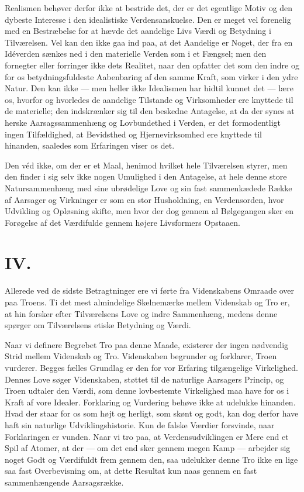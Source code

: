 \documentclass[12pt,a4paper]{article}
\begin{document}
Realismen behøver derfor ikke at bestride det, der er det egentlige
Motiv og den dybeste Interesse i den idealistiske Verdensanskuelse. Den
er meget vel forenelig med en Bestræbelse for at hævde det aandelige
Livs Værdi og Betydning i Tilværelsen. Vel kan den ikke gaa ind paa, at
det Aandelige er Noget, der fra en Idéverden sænkes ned i den materielle
Verden som i et Fængsel; men den fornegter eller forringer ikke dets
Realitet, naar den opfatter det som den indre og for os
betydningsfuldeste Aabenbaring af den samme Kraft, som virker i den
ydre Natur. Den kan ikke --- men heller ikke Idealismen har hidtil
kunnet det --- lære os, hvorfor og hvorledes de aandelige Tilstande og
Virksomheder ere knyttede til de materielle; den indskrænker sig til den
beskedne Antagelse, at da der synes at herske Aarsagssammenhæng og
Lovbundethed i Verden, er det formodentligt ingen Tilfældighed, at
Bevidsthed og Hjernevirksomhed ere knyttede til hinanden, saaledes som
Erfaringen viser os det.

Den véd ikke, om der er et Maal, henimod hvilket hele Tilværelsen
styrer, men den finder i sig selv ikke nogen Umulighed i den Antagelse,
at hele denne store Natursammenhæng med sine ubrødelige Love og sin fast
sammenkædede Række af Aarsager og Virkninger er som en stor Husholdning,
en Verdensorden, hvor Udvikling og Opløsning skifte, men hvor der dog
gennem al Bølgegangen sker en Forøgelse af det Værdifulde gennem højere
Livsformers Opstaaen.

\section*{IV.}

Allerede ved de sidste Betragtninger ere vi førte fra Videnskabens
Omraade over paa Troens. Ti det mest almindelige Skelnemærke mellem
Videnskab og Tro er, at hin forsker efter Tilværelsens Love og indre
Sammenhæng, medens denne spørger om Tilværelsens etiske Betydning og
Værdi.

Naar vi definere Begrebet Tro paa denne Maade, existerer der ingen
nødvendig Strid mellem Videnskab og Tro. Videnskaben begrunder og
forklarer, Troen vurderer. Begges fælles Grundlag er den for vor
Erfaring tilgængelige Virkelighed. Dennes Love søger Videnskaben, støttet
til de naturlige Aarsagers Princip, og Troen udtaler den Værdi, som
denne lovbestemte Virkelighed maa have for os i Kraft af vore Idealer.
Forklaring og Vurdering behøve ikke at udelukke hinanden. Hvad der staar
for os som højt og herligt, som skønt og godt, kan dog derfor have haft
sin naturlige Udviklingshistorie. Kun de falske Værdier forsvinde, naar
Forklaringen er vunden. Naar vi tro paa, at Verdensudviklingen er Mere
end et Spil af Atomer, at der --- om det end sker gennem megen Kamp ---
arbejder sig noget Godt og Værdifuldt frem gennem den, saa udelukker
denne Tro ikke en lige saa fast Overbevisning om, at dette Resultat kun
naas gennem en fast sammenhængende Aarsagsrække.
\end{document}
